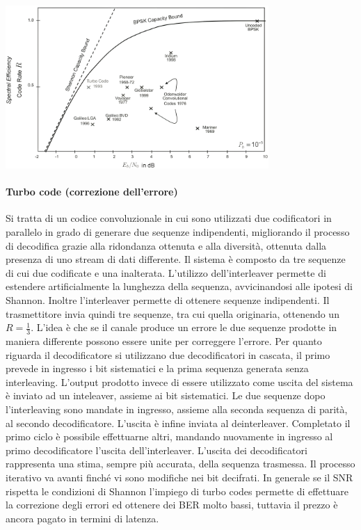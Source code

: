
\begin{center}
    \includegraphics[width=0.75\textwidth]{imgs/codes_and_shannon_bound.png}
\end{center}
\paragraph*{Turbo code (correzione dell'errore)}

Si tratta di un codice convoluzionale in cui sono utilizzati due codificatori in parallelo in grado di generare due sequenze indipendenti, migliorando il processo di decodifica grazie alla ridondanza ottenuta e alla diversità, ottenuta dalla presenza di uno stream di dati differente.
Il sistema è composto da tre sequenze di cui due codificate e una inalterata. L'utilizzo dell'interleaver permette di estendere artificialmente la lunghezza della sequenza, avvicinandosi alle ipotesi di Shannon. Inoltre l'interleaver permette di ottenere sequenze indipendenti. 
Il trasmettitore invia quindi tre sequenze, tra cui quella originaria, ottenendo un $R=\frac{1}{3}$. L'idea è che se il canale produce un errore le due sequenze prodotte in maniera differente possono essere unite  per correggere l'errore.
Per quanto riguarda il decodificatore si utilizzano due decodificatori in cascata, il primo prevede in ingresso i bit sistematici e la prima sequenza generata senza interleaving. L'output prodotto invece di essere utilizzato come uscita del sistema è inviato ad un inteleaver, assieme ai bit sistematici. 
Le due sequenze dopo l'interleaving sono mandate in ingresso, assieme alla seconda sequenza di parità, al secondo decodificatore. L'uscita è infine inviata al deinterleaver. 
Completato il primo ciclo è possibile effettuarne altri, mandando nuovamente in ingresso al primo decodificatore l'uscita dell'interleaver. 
L'uscita dei decodificatori rappresenta una stima, sempre più accurata, della sequenza trasmessa. Il processo iterativo va avanti finché vi sono modifiche nei bit decifrati.
In generale se il SNR rispetta le condizioni di Shannon l'impiego di turbo codes permette di effettuare la correzione degli errori ed ottenere dei BER molto bassi, tuttavia il prezzo è ancora pagato in termini di latenza.






